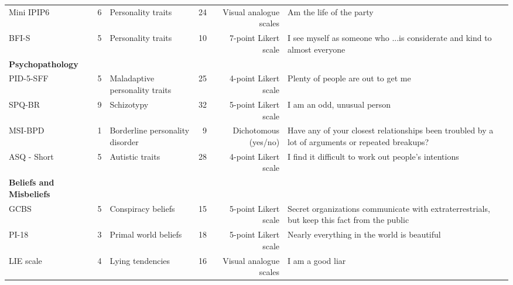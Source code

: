 \begin{table}
\begin{tabular*}{\linewidth}{@{\extracolsep{\fill}}lrlrrl}
Mini IPIP6 & 6 & Personality traits & 24 & Visual analogue scales & Am the life of the party \\ 
BFI-S & 5 & Personality traits & 10 & 7-point Likert scale & I see myself as someone who ...is considerate and kind to almost everyone \\ 
{\bfseries Psychopathology} &  &  &  &  &  \\ 
PID-5-SFF & 5 & Maladaptive personality traits & 25 & 4-point Likert scale & Plenty of people are out to get me \\ 
SPQ-BR & 9 & Schizotypy & 32 & 5-point Likert scale & I am an odd, unusual person \\ 
MSI-BPD & 1 & Borderline personality disorder & 9 & Dichotomous (yes/no) & Have any of your closest relationships been troubled by a lot of arguments or repeated breakups? \\ 
ASQ - Short & 5 & Autistic traits & 28 & 4-point Likert scale & I find it difficult to work out people’s intentions \\ 
{\bfseries Beliefs and Misbeliefs} &  &  &  &  &  \\ 
GCBS & 5 & Conspiracy beliefs & 15 & 5-point Likert scale & Secret organizations communicate with extraterrestrials, but keep this fact from the public \\ 
PI-18 & 3 & Primal world beliefs & 18 & 5-point Likert scale & Nearly everything in the world is beautiful \\ 
LIE scale & 4 & Lying tendencies & 16 & Visual analogue scales & I am a good liar \\ 
\bottomrule
\end{tabular*}
\end{table}

